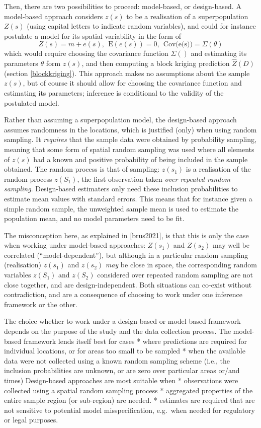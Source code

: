 \documentclass[]{book}
\begin{document}
Then, there are two possibilities to proceed: model-based, or
design-based. A model-based approach considers \(z(s)\) to be a
realisation of a superpopulation \(Z(s)\) (using capital letters to
indicate random variables), and could for instance postulate a
model for its spatial variability in the form of
\[Z(s) = m + e(s), \  \ \mbox{E}(e(s)) = 0, \  \ \mbox{Cov(e(s))} = \Sigma(\theta)\]
which would require choosing the covariance function \(\Sigma()\) and
estimating its parameters \(\theta\) form \(z(s)\), and then computing a
block kriging prediction \(\hat{Z}(D)\) (section \ref{blockkriging}).
This approach makes no assumptions about the sample \(z(s)\), but of
course it should allow for choosing the covariance function and
estimating its parameters; inference is conditional to the validity
of the postulated model.

Rather than assuming a superpopulation model, the design-based
approach \citep{de1990model, brus2021, breidt2017model} assumes
randomness in the locations, which is justified (only) when using
random sampling. It \emph{requires} that the sample data were obtained
by probability sampling, meaning that some form of spatial random
sampling was used where all elements of \(z(s)\) had a known and
positive probability of being included in the sample obtained. The
random process is that of sampling: \(z(s_1)\) is a realisation of
the random process \(z(S_1)\), the first observation taken \emph{over
repeated random sampling}. Design-based estimaters only need
these inclusion probabilities to estimate mean values with standard
errors. This means that for instance given a simple random sample,
the unweighted sample mean is used to estimate the population mean,
and no model parameters need to be fit.

The misconception here, as explained in {[}brus2021{]}, is that this is
only the case when working under model-based approaches: \(Z(s_1)\)
and \(Z(s_2)\) may well be correlated (``model-dependent''), but although
in a particular random sampling (realisation) \(z(s_1)\) and \(z(s_2)\)
\emph{may} be close in space, the corresponding random variables \(z(S_1)\)
and \(z(S_2)\) considered over repeated random sampling are not close
together, and are design-independent. Both situations can co-exist
without contradiction, and are a consequence of choosing to work
under one inference framework or the other.

The choice whether to work under a design-based or model-based
framework depends on the purpose of the study and the
data collection process. The model-based framework lends itself best for cases
* where predictions are required for individual locations, or
for areas too small to be sampled
* when the available data were not collected using a known random
sampling scheme (i.e., the inclusion probabilities are unknown,
or are zero over particular areas or/and times)
Design-based approaches are most suitable when
* observations were collected using a spatial random sampling process
* aggregated properties of the entire sample region (or sub-region)
are needed.
* estimates are required that are not sensitive to potential model
misspecification, e.g.~when needed for regulatory or legal purposes.
\end{document}
